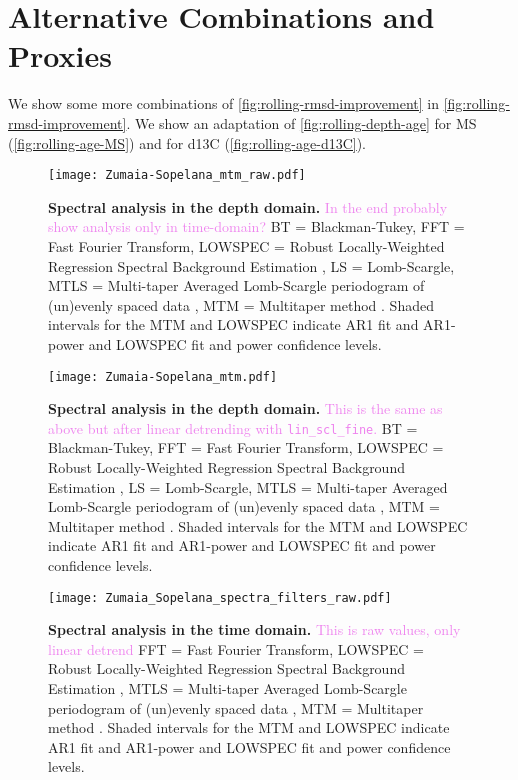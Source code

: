 \documentclass[draft]{agujournal2019}
\newcommand{\ijk}{\textcolor{violet}}
\begin{document}
\section{Alternative Combinations and Proxies}

We show some more combinations of \cref{fig:rolling-rmsd-improvement} in \cref{fig:rolling-rmsd-improvement}.
We show an adaptation of \cref{fig:rolling-depth-age} for \gls{MS} (\cref{fig:rolling-age-MS}) and for \gls{d13C} (\cref{fig:rolling-age-d13C}).

\begin{figure}[htb]
  \centering \texttt{[image: Zumaia-Sopelana\_mtm\_raw.pdf]}
  \caption{\label{fig:spectral-depth}
    \textbf{Spectral analysis in the depth domain.}
    \ijk{In the end probably show analysis only in time-domain?}
    BT = Blackman-Tukey,
    FFT = Fast Fourier Transform,
    LOWSPEC = Robust Locally-Weighted Regression Spectral Background Estimation \cite{Meyers2012},
    LS = Lomb-Scargle,
    MTLS = Multi-taper Averaged Lomb-Scargle periodogram of (un)evenly
spaced data \cite{Springford2020},
    MTM = Multitaper method \cite{Thomson1982}.
    Shaded intervals for the MTM and LOWSPEC indicate AR1 fit and AR1-power and LOWSPEC fit and power confidence levels.
  }
\end{figure}

\begin{figure}[htb]
  \centering \texttt{[image: Zumaia-Sopelana\_mtm.pdf]}
  \caption{\label{fig:spectral-depth}
    \textbf{Spectral analysis in the depth domain.}
    \ijk{This is the same as above but after linear detrending with \texttt{lin\_scl\_fine}.}
    BT = Blackman-Tukey,
    FFT = Fast Fourier Transform,
    LOWSPEC = Robust Locally-Weighted Regression Spectral Background Estimation \cite{Meyers2012},
    LS = Lomb-Scargle,
    MTLS = Multi-taper Averaged Lomb-Scargle periodogram of (un)evenly
spaced data \cite{Springford2020},
    MTM = Multitaper method \cite{Thomson1982}.
    Shaded intervals for the MTM and LOWSPEC indicate AR1 fit and AR1-power and LOWSPEC fit and power confidence levels.
  }
\end{figure}


\begin{figure}[htb]
  \centering \texttt{[image: Zumaia\_Sopelana\_spectra\_filters\_raw.pdf]}
  \caption{\label{fig:spectral-age-raw}
    \textbf{Spectral analysis in the time domain.}
    \ijk{This is raw values, only linear detrend}
    FFT = Fast Fourier Transform,
    LOWSPEC = Robust Locally-Weighted Regression Spectral Background Estimation \cite{Meyers2012},
    MTLS = Multi-taper Averaged Lomb-Scargle periodogram of (un)evenly
spaced data \cite{Springford2020},
    MTM = Multitaper method \cite{Thomson1982}.
    Shaded intervals for the MTM and LOWSPEC indicate AR1 fit and AR1-power and LOWSPEC fit and power confidence levels.
  }
\end{figure}
\end{document}

